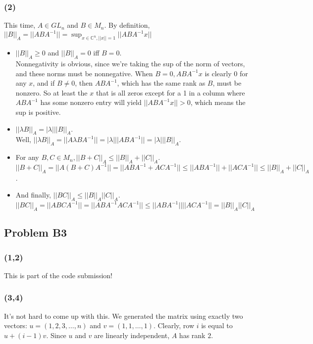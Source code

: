 \documentclass{article}
\newcommand{\complex}{\mathbb{C}}
\begin{document}
\subsubsection{(2)}
This time, $A \in GL_n$ and $B \in M_n$. By definition, 
$||B||_A = ||ABA^{-1}|| = \displaystyle{\sup_{x \in \complex^n, ||x|| = 1}} ||ABA^{-1}x||$
\begin{itemize}
  \item $||B||_A \geq 0$ and $||B||_A = 0$ iff $B = 0$. \\
    Nonnegativity is obvious, since we're taking the sup of the norm of vectors, and these norms must
    be nonnegative. When $B = 0, ABA^{-1}x$ is clearly $0$ for any $x$, and if $B \neq 0$,
    then $ABA^{-1}$, which has the same rank as $B$, must be nonzero.
    So at least the $x$ that is all zeros except for a 1 in a column where $ABA^{-1}$ has
    some nonzero entry will yield $||ABA^{-1}x|| > 0$, which means the sup is positive.
  \item $||\lambda B||_A = |\lambda|||B||_A$.\\
    Well, $||\lambda B||_A = ||A\lambda BA^{-1}|| = |\lambda|||ABA^{-1}|| = |\lambda|||B||_A$.
  \item For any $B, C \in M_n, ||B + C||_A \leq ||B||_A + ||C||_A$.\\
    $||B + C||_A = ||A(B + C)A^{-1}|| = ||ABA^{-1} + ACA^{-1}|| \leq ||ABA^{-1}|| + ||ACA^{-1}||
     \leq ||B||_A + ||C||_A$.
  \item And finally, $||BC||_A \leq ||B||_A||C||_A$.\\
    $||BC||_A = ||ABCA^{-1}|| = ||ABA^{-1}ACA^{-1}|| \leq ||ABA^{-1}||||ACA^{-1}|| = ||B||_A||C||_A$

\end{itemize}

\subsection{Problem B3}
\subsubsection{(1,2)} This is part of the code submission!
\subsubsection{(3,4)}
It's not hard to come up with this. We generated the matrix using exactly two vectors:
$u = (1,2,3,\dots,n)$ and $v = (1,1,\dots,1)$. Clearly, row $i$ is equal to $u + (i-1)v$.
Since $u$ and $v$ are linearly independent, $A$ has rank $2$.
\end{document}
